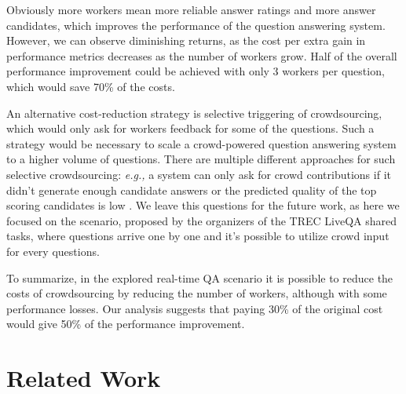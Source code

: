 \documentclass[letterpaper]{article}
\makeatletter
\newcommand{\eg}{\textit{e.g.,}\@\xspace}
\makeatother
\begin{document}
Obviously more workers mean more reliable answer ratings and more answer candidates, which improves the performance of the question answering system.
However, we can observe diminishing returns, as the cost per extra gain in performance metrics decreases as the number of workers grow.
Half of the overall performance improvement could be achieved with only 3 workers per question, which would save 70\% of the costs.

An alternative cost-reduction strategy is selective triggering of crowdsourcing, which would only ask for workers feedback for some of the questions.
Such a strategy would be necessary to scale a crowd-powered question answering system to a higher volume of questions.
There are multiple different approaches for such selective crowdsourcing: \eg a system can only ask for crowd contributions if it didn't generate enough candidate answers or the predicted quality of the top scoring candidates is low \cite{carmel2010estimating,he2006query}.
We leave this questions for the future work, as here we focused on the scenario, proposed by the organizers of the TREC LiveQA shared tasks, where questions arrive one by one and it's possible to utilize crowd input for every questions.

To summarize, in the explored real-time QA scenario it is possible to reduce the costs of crowdsourcing by reducing the number of workers, although with some performance losses.
Our analysis suggests that paying 30\% of the original cost would give 50\% of the performance improvement.

\section{Related Work}
\label{sec:related_work}
\end{document}
